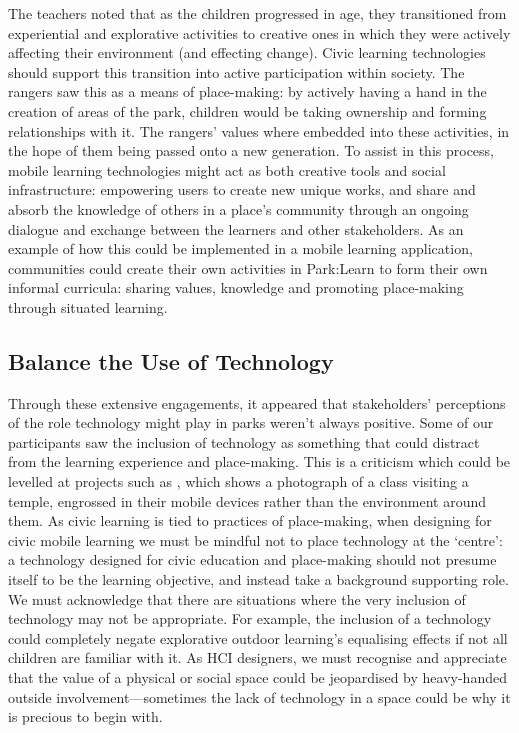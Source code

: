 The teachers noted that as the children progressed in age, they transitioned from experiential and explorative activities to creative ones in which they were actively affecting their environment (and effecting change). Civic learning technologies should support this transition into active participation within society. The rangers saw this as a means of place-making: by actively having a hand in the creation of areas of the park, children would be taking ownership and forming relationships with it. The rangers’ values where embedded into these activities, in the hope of them being passed onto a new generation. To assist in this process, mobile learning technologies might act as both creative tools and social infrastructure: empowering users to create new unique works, and share and absorb the knowledge of others in a place’s community through an ongoing dialogue and exchange between the learners and other stakeholders. As an example of how this could be implemented in a mobile learning application, communities could create their own activities in Park:Learn to form their own informal curricula: sharing values, knowledge and promoting place-making through situated learning.

\subsection{Balance the Use of Technology}
\label{sec:BalanceTechUse}

Through these extensive engagements, it appeared that stakeholders’ perceptions of the role technology might play in parks weren't always positive. Some of our participants saw the inclusion of technology as something that could distract from the learning experience and place-making. This is a criticism which could be levelled at projects such as \citep{Shih2010}, which shows a photograph of a class visiting a temple, engrossed in their mobile devices rather than the environment around them. As civic learning is tied to practices of place-making, when designing for civic mobile learning we must be mindful not to place technology at the `centre': a technology designed for civic education and place-making should not presume itself to be the learning objective, and instead take a background supporting role. We must acknowledge that there are situations where the very inclusion of technology may not be appropriate. For example, the inclusion of a technology could completely negate explorative outdoor learning’s equalising effects if not all children are familiar with it. As HCI designers, we must recognise and appreciate that the value of a physical or social space could be jeopardised by heavy-handed outside involvement—sometimes the lack of technology in a space could be why it is precious to begin with.

